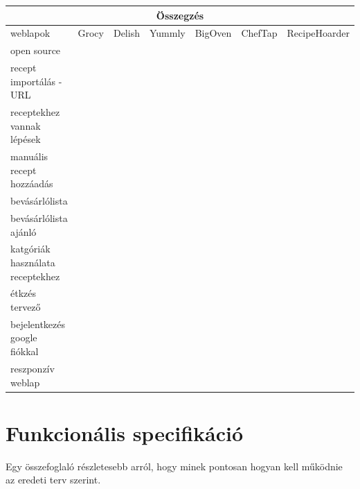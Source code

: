 \documentclass[12pt]{report}
\theoremstyle{definition}
\begin{document}
\noindent
\begin{tabular}{p{3cm} | c c c c c | c @{}}
	\multicolumn{7}{c}{Összegzés}                                                                   \\ \midrule
	weblapok                         & Grocy  & Delish & Yummly & BigOven & ChefTap & RecipeHoarder \\ \cmidrule[2pt](r){2-7}
	open source                      & \cmark & \xmark & \xmark & \xmark  & \xmark  & \xmark        \\\cmidrule(r){2-7}
	recept importálás - URL          & \xmark & \xmark & \xmark & \cmark  & \cmark  & \cmark        \\ \cmidrule(r){2-7}
	receptekhez vannak lépések       & \xmark & \cmark & \cmark & \xmark  & \cmark  & \cmark        \\ \cmidrule(r){2-7}
	manuális recept hozzáadás        & \cmark & \xmark & \xmark & \cmark  & \cmark  & \cmark        \\ \cmidrule(r){2-7}
	bevásárlólista                   & \cmark & \xmark & \cmark & \cmark  & \cmark  & \cmark        \\ \cmidrule(r){2-7}
	bevásárlólista ajánló            & \cmark & \xmark & \xmark & \xmark  & \xmark  & \cmark        \\ \cmidrule(r){2-7}
	katgóriák használata receptekhez & \xmark & \cmark & \cmark & \xmark  & \cmark  & \cmark        \\ \cmidrule(r){2-7}
	étkzés tervező                   & \cmark & \xmark & \cmark & \xmark  & \xmark  & \xmark        \\ \cmidrule(r){2-7}
	bejelentkezés google fiókkal     & \xmark & \cmark & \cmark & \cmark  & \xmark  & \cmark        \\ \cmidrule(r){2-7}
	reszponzív weblap                & \cmark & \xmark & \xmark & \xmark  & \xmark  & \cmark        \\ \bottomrule
\end{tabular}

\chapter{Funkcionális specifikáció}
Egy összefoglaló részletesebb arról, hogy minek pontosan hogyan kell működnie az eredeti terv szerint. \\
\end{document}
